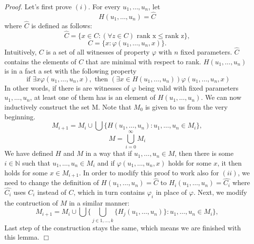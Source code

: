 \documentclass[12pt,a4paper]{article}
\newenvironment{proof}
{\noindent \textit{Proof.}}
{\hspace*{\fill} $\Box$}
\begin{document}
\begin{proof}
Let's first prove $(i)$. 
For every $u_1,\ldots,u_n$, let 
\begin{equation}
H(u_1,\ldots,u_n) = \hat{C}
\end{equation}
where $\hat{C}$ is defined as follows:
\begin{equation}
\hat{C} = \{x \in C : (\forall z \in C) \mbox{ rank x} \leq \mbox{rank z} \},
\end{equation}
\begin{equation}
C = \{x: \varphi(u_1,\ldots,u_n,x)\}.
\end{equation}
Intuitively, $C$ is a set of all witnesses of property $\varphi$ with $n$ fixed parameters. $\hat{C}$ contains the elements of $C$ that are minimal with respect to rank.
$H(u_1,\ldots,u_n)$ is in a fact a set with the following property
\begin{equation}
\mbox{ if }\exists x \varphi(u_1,\ldots,u_n,x), \mbox{ then } (\exists x \in H(u_1,\ldots,u_n))\varphi(u_1,\ldots,u_n,x)
\end{equation}
In other words, if there is are witnesses of $\varphi$ being valid with fixed parameters $u_1,\ldots,u_n$, at least one of them has is an element of $H(u_1,\ldots,u_n)$.
\newline
We can now inductively construct the set M. Note that $M_0$ is given to us from the very beginning.
\begin{equation}
M_{i+1}=M_i \cup \bigcup\{H(u_1,\ldots,u_n): u_1,\ldots,u_n\in M_i \} ,
\end{equation}
\begin{equation}
M=\bigcup_{i=0}^\infty M_i
\end{equation}
We have defined $H$ and $M$ in a way that if $u_1,\ldots,u_n \in M$, then there is some $i \in \mathbb{N}$ such that $u_1,\ldots,u_n \in M_i$ and if $\varphi(u_1,\ldots,u_n,x)$ holds for some $x$, it then holds for some $x \in M_{i+1}$.
\newline\newline
In order to modify this proof to work also for $(ii)$, we need to change the definition of $H(u_1,\ldots,u_n) = \hat{C}$ to $H_i(u_1,\ldots,u_n) = \hat{C_i}$ where $\hat{C_i}$ uses $C_i$ instead of $C$, which in turn contains $\varphi_i$ in place of $\varphi$.
Next, we modify the contruction of $M$ in a similar manner:\newline
\begin{equation}
M_{i+1}=M_i \cup \bigcup\{\bigcup_{j \in 1,\ldots,k}\{H_j(u_1,\ldots,u_n)\}: u_1,\ldots,u_n\in M_i \} ,
\end{equation}
Last step of the construction stays the same, which means we are finished with this lemma.
\end{proof}
\end{document}

